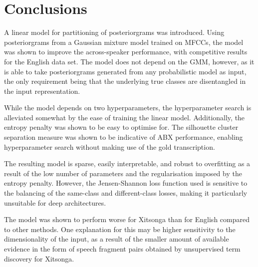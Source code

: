 \section{Conclusions}
A linear model for partitioning of posteriorgrams was introduced.
Using posteriorgrams from a Gaussian mixture model trained on MFCCs, the model was shown to improve the across-speaker performance, with competitive  results for the English data set.
The model does not depend on the GMM, however, as it is able to take posteriorgrams generated from any probabilistic model as input, the only requirement being that the underlying true classes are disentangled in the input representation.

While the model depends on two hyperparameters, the hyperparameter search is alleviated somewhat by the ease of training the linear model.
Additionally, the entropy penalty was shown to be easy to optimise for.
The silhouette cluster separation measure was shown to be indicative of ABX performance, enabling hyperparameter search without making use of the gold transcription.

The resulting model is sparse, easily interpretable, and robust to overfitting as a result of the low number of parameters and the regularisation imposed by the entropy penalty.
However, the Jensen-Shannon loss function used is sensitive to the balancing of the same-class and different-class losses, making it particularly unsuitable for deep architectures.

The model was shown to perform worse for Xitsonga than for English compared to other methods.
One explanation for this may be higher sensitivity to the dimensionality of the input, as a result of the smaller amount of available evidence in the form of speech fragment pairs obtained by unsupervised term discovery for Xitsonga.


